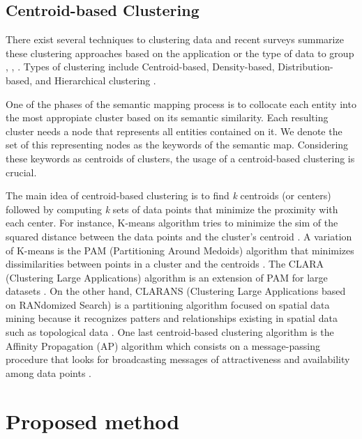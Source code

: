 \documentclass{ieeeaccess}
\begin{document}
\subsection{Centroid-based Clustering}

There exist several techniques to clustering data and recent surveys
summarize these clustering approaches based on the application or
the type of data to group \cite{Dongkuan2015}, 
\cite{DBLP:books/crc/aggarwal2013}, \cite{firdaus2015survey}. Types of
clustering include Centroid-based, Density-based, Distribution-based, and
Hierarchical clustering \cite{google_2022}.

One of the phases of the semantic mapping process is to collocate each entity
into the most appropiate cluster based on its semantic similarity. Each 
resulting cluster needs a node that represents all entities contained on it. We
denote the set of this representing nodes as the keywords of the semantic map. 
Considering these keywords as centroids of clusters, the usage of a centroid-based
clustering is crucial.

The main idea of centroid-based clustering is to find
\textit{k} centroids (or centers) followed by computing \textit{k} sets of data
points that minimize the proximity with each center. For instance, K-means algorithm 
tries to minimize the sim of the squared distance between the data points 
and the cluster's centroid \cite{macqueen1967classification}. A variation of
K-means is the PAM (Partitioning Around Medoids) algorithm that minimizes
dissimilarities between points in a cluster and the centroids 
\cite{kaufmanPAM}. The CLARA (Clustering Large Applications) algorithm is an extension of 
PAM for large datasets \cite{kaufmanCLARA}. On the other hand, CLARANS 
(Clustering Large Applications based on RANdomized Search) is a 
partitioning algorithm focused on spatial data mining because it recognizes
patters and relationships existing in spatial data such as topological
data \cite{ng2002clarans}. One last centroid-based clustering algorithm is the Affinity Propagation (AP) algorithm which 
consists on a message-passing procedure that looks for broadcasting messages of
attractiveness and availability among data points \cite{frey2007clustering}.

\section{Proposed method}
\label{sec:Method}
\end{document}
